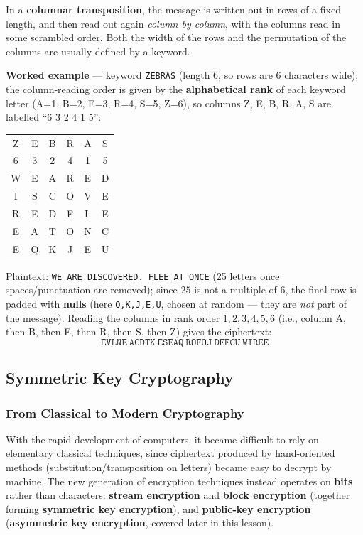\documentclass[12pt, a4paper]{article}
\begin{document}
In a \textbf{columnar transposition}, the message is written out in rows of a fixed length, and then read out again \emph{column by column}, with the columns read in some scrambled order. Both the width of the rows and the permutation of the columns are usually defined by a keyword.

\textbf{Worked example} --- keyword \texttt{ZEBRAS} (length 6, so rows are 6 characters wide); the column-reading order is given by the \textbf{alphabetical rank} of each keyword letter (A=1, B=2, E=3, R=4, S=5, Z=6), so columns Z, E, B, R, A, S are labelled ``6 3 2 4 1 5'':
\begin{center}
\begin{tabular}{@{}cccccc@{}}
\toprule
Z & E & B & R & A & S \\
6 & 3 & 2 & 4 & 1 & 5 \\
\midrule
W & E & A & R & E & D \\
I & S & C & O & V & E \\
R & E & D & F & L & E \\
E & A & T & O & N & C \\
E & Q & K & J & E & U \\
\bottomrule
\end{tabular}
\end{center}
Plaintext: \texttt{WE ARE DISCOVERED. FLEE AT ONCE} (25 letters once spaces/punctuation are removed); since $25$ is not a multiple of $6$, the final row is padded with \textbf{nulls} (here \texttt{Q,K,J,E,U}, chosen at random --- they are \emph{not} part of the message). Reading the columns in rank order $1,2,3,4,5,6$ (i.e., column A, then B, then E, then R, then S, then Z) gives the ciphertext:
\[
\texttt{EVLNE}\ \texttt{ACDTK}\ \texttt{ESEAQ}\ \texttt{ROFOJ}\ \texttt{DEECU}\ \texttt{WIREE}
\]

\subsection{Symmetric Key Cryptography}

\subsubsection{From Classical to Modern Cryptography}
With the rapid development of computers, it became difficult to rely on elementary classical techniques, since ciphertext produced by hand-oriented methods (substitution/transposition on letters) became easy to decrypt by machine. The new generation of encryption techniques instead operates on \textbf{bits} rather than characters: \textbf{stream encryption} and \textbf{block encryption} (together forming \textbf{symmetric key encryption}), and \textbf{public-key encryption} (\textbf{asymmetric key encryption}, covered later in this lesson).
\end{document}
